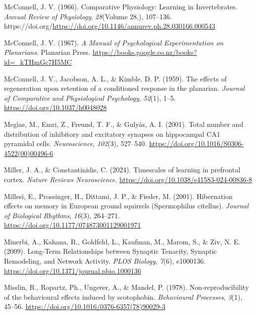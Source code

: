 \documentclass[
  jou,
  floatsintext,
  longtable,
  nolmodern,
  notxfonts,
  notimes,
  donotrepeattitle,
  colorlinks=true,linkcolor=blue,citecolor=blue,urlcolor=blue]{apa7}
\newlength{\cslhangindent}
\newenvironment{CSLReferences}[2] %
 {\begin{list}{}{%
  \setlength{\itemindent}{0pt}
  \setlength{\leftmargin}{0pt}
  \setlength{\parsep}{0pt}
  \ifodd #1
   \setlength{\leftmargin}{\cslhangindent}
   \setlength{\itemindent}{-1\cslhangindent}
  \fi
  \setlength{\itemsep}{#2\baselineskip}}}
 {\end{list}}
\begin{document}
\begin{CSLReferences}{1}{0}
McConnell, J. V. (1966). Comparative {Physiology}: {Learning} in
{Invertebrates}. \emph{Annual Review of Physiology}, \emph{28}(Volume
28,), 107--136.
https://doi.org/\url{https://doi.org/10.1146/annurev.ph.28.030166.000543}

McConnell, J. V. (1967). \emph{A {Manual} of {Psychological}
{Experimentation} on {Planarians}}. Planarian Press.
\url{https://books.google.co.nz/books?id=_kTHmGc7H5MC}

McConnell, J. V., Jacobson, A. L., \& Kimble, D. P. (1959). The effects
of regeneration upon retention of a conditioned response in the
planarian. \emph{Journal of Comparative and Physiological Psychology},
\emph{52}(1), 1--5. \url{https://doi.org/10.1037/h0048028}

Megı́as, M., Emri, Z., Freund, T. F., \& Gulyás, A. I. (2001). Total
number and distribution of inhibitory and excitatory synapses on
hippocampal {CA1} pyramidal cells. \emph{Neuroscience}, \emph{102}(3),
527--540. \url{https://doi.org/10.1016/S0306-4522(00)00496-6}

Miller, J. A., \& Constantinidis, C. (2024). Timescales of learning in
prefrontal cortex. \emph{Nature Reviews Neuroscience}.
\url{https://doi.org/10.1038/s41583-024-00836-8}

Millesi, E., Prossinger, H., Dittami, J. P., \& Fieder, M. (2001).
Hibernation effects on memory in {European} ground squirrels
({Spermophilus} citellus). \emph{Journal of Biological Rhythms},
\emph{16}(3), 264--271. \url{https://doi.org/10.1177/074873001129001971}

Minerbi, A., Kahana, R., Goldfeld, L., Kaufman, M., Marom, S., \& Ziv,
N. E. (2009). Long-{Term} {Relationships} between {Synaptic} {Tenacity},
{Synaptic} {Remodeling}, and {Network} {Activity}. \emph{PLOS Biology},
\emph{7}(6), e1000136.
\url{https://doi.org/10.1371/journal.pbio.1000136}

Misslin, R., Ropartz, Ph., Ungerer, A., \& Mandel, P. (1978).
Non-reproducibility of the behavioural effects induced by scotophobin.
\emph{Behavioural Processes}, \emph{3}(1), 45--56.
\url{https://doi.org/10.1016/0376-6357(78)90029-3}


\end{CSLReferences}
\end{document}
